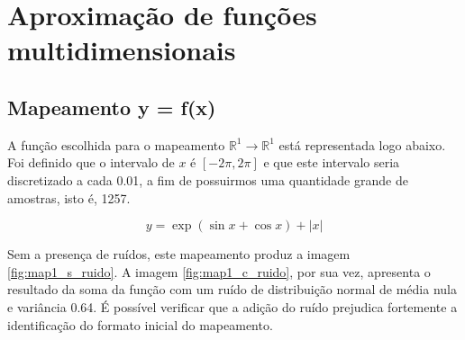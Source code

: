 \section{Aproximação de funções multidimensionais}

\subsection {Mapeamento y = f(x)}

A função escolhida para o mapeamento \(\mathbb{R}^1 \rightarrow \mathbb{R}^1\)
está representada logo abaixo. Foi definido que o intervalo de \(x\) é
\([-2\pi,2\pi]\) e que este intervalo seria discretizado a cada 0.01, a fim de
possuirmos uma quantidade grande de amostras, isto é, 1257.

\begin{equation}
y = \exp(\sin x + \cos x) + \left|x\right|
\label{eq:map1}
\end{equation}

Sem a presença de ruídos, este mapeamento produz a imagem
\ref{fig:map1_s_ruido}. A imagem \ref{fig:map1_c_ruido}, por sua vez, apresenta
o resultado da soma da função com um ruído de distribuição normal de média nula
e variância 0.64. É possível verificar que a adição do ruído prejudica
fortemente a identificação do formato inicial do mapeamento. 

\FloatBarrier
			    

